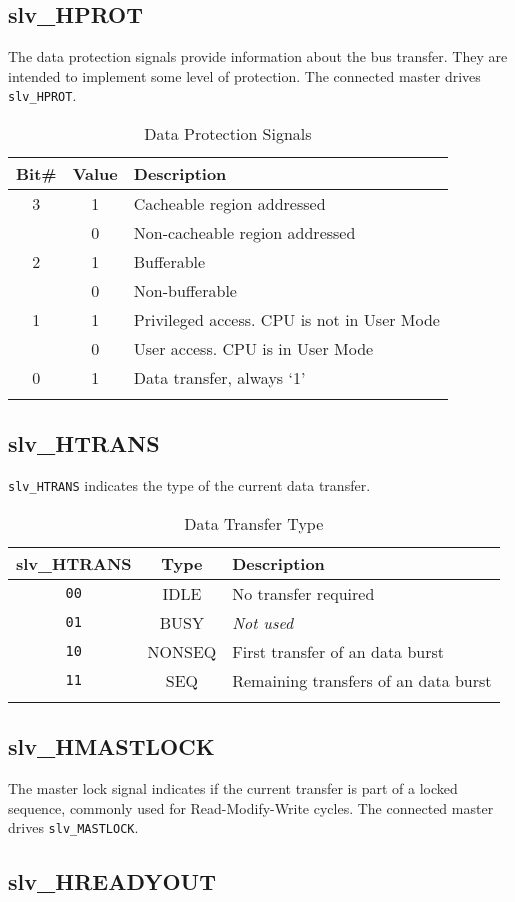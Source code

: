 \subsection{slv\_HPROT}\label{slv_hprot}

The data protection signals provide information about the bus transfer.
They are intended to implement some level of protection. The connected
master drives \texttt{slv\_HPROT}.

\begin{longtable}[]{@{}ccl@{}}
\toprule
Bit\# & Value & Description\tabularnewline
\midrule
\endhead
3 & 1 & Cacheable region addressed\tabularnewline
& 0 & Non-cacheable region addressed\tabularnewline
2 & 1 & Bufferable\tabularnewline
& 0 & Non-bufferable\tabularnewline
1 & 1 & Privileged access. CPU is not in User Mode\tabularnewline
& 0 & User access. CPU is in User Mode\tabularnewline
0 & 1 & Data transfer, always `1'\tabularnewline
\bottomrule
\caption{Data Protection Signals}
\end{longtable}

\subsection{slv\_HTRANS}\label{slv_htrans}

\texttt{slv\_HTRANS} indicates the type of the current data transfer.

\begin{longtable}[]{@{}ccl@{}}
\toprule
slv\_HTRANS & Type & Description\tabularnewline
\midrule
\endhead
\texttt{00} & IDLE & No transfer required\tabularnewline
\texttt{01} & BUSY & \emph{Not used}\tabularnewline
\texttt{10} & NONSEQ & First transfer of an data burst\tabularnewline
\texttt{11} & SEQ & Remaining transfers of an data burst\tabularnewline
\bottomrule
\caption{Data Transfer Type}
\end{longtable}

\subsection{slv\_HMASTLOCK}\label{slv_hmastlock}

The master lock signal indicates if the current transfer is part of a
locked sequence, commonly used for Read-Modify-Write cycles. The
connected master drives \texttt{slv\_MASTLOCK}.

\subsection{slv\_HREADYOUT}\label{slv_hreadyout}

